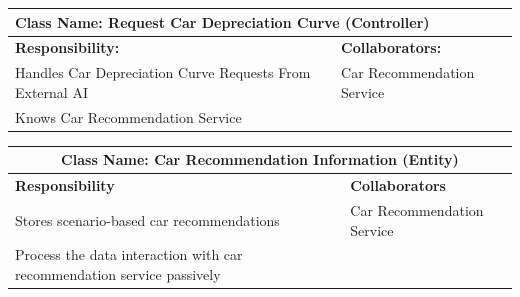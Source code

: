 \documentclass[]{article}
\begin{document}
\begin{table}[H]
  \centering
  \renewcommand{\arraystretch}{1.3} %
  \begin{tabular}{|p{7.5cm}|p{7.5cm}|}
    \hline
    \multicolumn{2}{|l|}{\textbf{Class Name: Request Car Depreciation Curve (Controller)}} \\
    \hline
    \textbf{Responsibility:}                                 & \textbf{Collaborators:}     \\
    \hline
    Handles Car Depreciation Curve Requests From External AI & Car Recommendation Service  \\
    Knows Car Recommendation Service                         &                             \\
    \hline
  \end{tabular}
\end{table}
\begin{table}[H]
  \centering
  \renewcommand{\arraystretch}{1.3} %
  \begin{tabular}{|p{7.5cm}|p{7.5cm}|}
    \hline
    \multicolumn{2}{|c|}{\textbf{Class Name: Car Recommendation Information (Entity)}}                  \\
    \hline
    \textbf{Responsibility}                                                & \textbf{Collaborators}     \\
    \hline
    Stores scenario-based car recommendations                              & Car Recommendation Service \\
    Process the data interaction with car recommendation service passively &  \\
    \hline
  \end{tabular}
\end{table}
\end{document}
